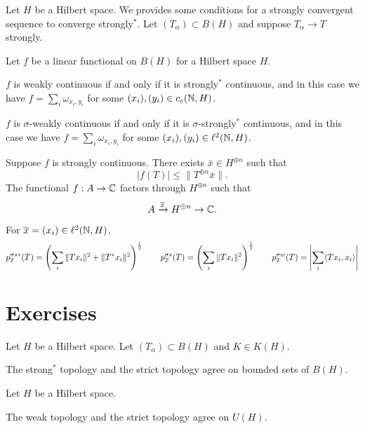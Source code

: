 \documentclass{../../large}
\begin{document}
\begin{prb}
Let $H$ be a Hilbert space.
We provides some conditions for a strongly convergent sequence to converge strongly$^*$.
Let $(T_\alpha)\subset B(H)$ and suppose $T_\alpha\to T$ strongly.
\end{prb}

\begin{prb}
Let $f$ be a linear functional on $B(H)$ for a Hilbert space $H$.
\begin{parts}
\item
$f$ is weakly continuous if and only if it is strongly$^*$ continuous, and in this case we have $f=\sum_i\omega_{x_i,y_i}$ for some $(x_i),(y_i)\in c_c(\mathbb{N},H)$.
\item
$f$ is $\sigma$-weakly continuous if and only if it is $\sigma$-strongly$^*$ continuous, and in this case we have $f=\sum_i\omega_{x_i,y_i}$ for some $(x_i),(y_i)\in\ell^2(\mathbb{N},H)$.
\end{parts}
\end{prb}
\begin{pf}
Suppose $f$ is strongly continuous.
There exists $\bar x\in H^{\oplus n}$ such that
\[|f(T)|\le\|T^{\oplus n}\bar x\|.\]
The functional $f:A\to\mathbb{C}$ factors through $H^{\oplus n}$ such that
\[A\xrightarrow{\overline x}H^{\oplus n}\to\mathbb{C}.\]
\end{pf}


For $\overline x=(x_i)\in\ell^2(\mathbb{N},H)$,
\[p_{\overline x}^{\sigma s*}(T)=\left(\sum_i\|Tx_i\|^2+\|T^*x_i\|^2\right)^{\frac12}\qquad
p_{\overline x}^{\sigma s}(T)=\left(\sum_i\|Tx_i\|^2\right)^{\frac12}\qquad
p_{\overline x}^{\sigma w}(T)=\left|\sum_i\langle Tx_i,x_i\rangle\right|\]

\section*{Exercises}


\begin{prb}
Let $H$ be a Hilbert space.
Let $(T_\alpha)\subset B(H)$ and $K\in K(H)$.
\begin{parts}
\item The strong$^*$ topology and the strict topology agree on bounded sets of $B(H)$.
\end{parts}
\end{prb}

\begin{prb}
Let $H$ be a Hilbert space.
\begin{parts}
\item The weak topology and the strict topology agree on $U(H)$.
\end{parts}
\end{prb}
\end{document}
